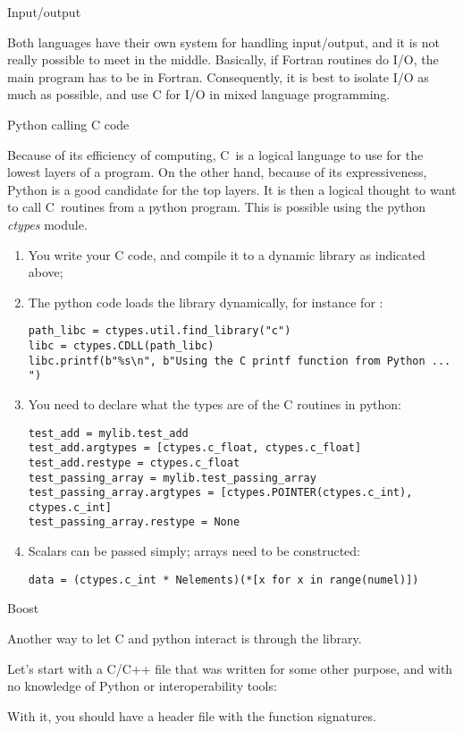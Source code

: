  {Input/output}

Both languages have their own system for handling input/output, and it
is not really possible to meet in the middle. Basically, if Fortran
routines do I/O, the main program has to be in Fortran. Consequently,
it is best to isolate I/O as much as possible, and use C for I/O in
mixed language programming.

 {Python calling C code}


Because of its efficiency of computing, C~is a logical language to use
for the lowest layers of a program. On the other hand, because of its
expressiveness, Python is a good candidate for the top layers. It is
then a logical thought to want to call C~routines from a python
program.
%
This is possible using the python \emph{ctypes}
module.
\begin{enumerate}
\item You write your C code, and compile it to a dynamic library as
  indicated above;
\item The python code loads the library dynamically, for instance for
  :
\begin{verbatim}
path_libc = ctypes.util.find_library("c")
libc = ctypes.CDLL(path_libc)
libc.printf(b"%s\n", b"Using the C printf function from Python ... ")
\end{verbatim}
\item You need to declare what the types are of the C routines in python:
\begin{verbatim}
test_add = mylib.test_add
test_add.argtypes = [ctypes.c_float, ctypes.c_float]
test_add.restype = ctypes.c_float
test_passing_array = mylib.test_passing_array
test_passing_array.argtypes = [ctypes.POINTER(ctypes.c_int), ctypes.c_int]
test_passing_array.restype = None
\end{verbatim}
\item Scalars can be passed simply; arrays need to be constructed:
\begin{verbatim}
data = (ctypes.c_int * Nelements)(*[x for x in range(numel)])
\end{verbatim}
\end{enumerate}

 {Boost}

Another way to let C and python interact is through the  library.

Let's start with a C/C++ file that was written for some other purpose,
and with no knowledge of Python or interoperability tools:
%

%
With it, you should have a  header file with
the function signatures.

